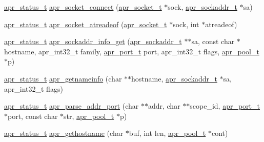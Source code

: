 \begin{DoxyCompactItemize}
\item 
\hyperlink{group__apr__errno_gaf76ee4543247e9fb3f3546203e590a6c}{apr\-\_\-status\-\_\-t} \hyperlink{group__apr__network__io_ga8e58bd8112ed2ce5004487918cd9275e}{apr\-\_\-socket\-\_\-connect} (\hyperlink{group__apr__network__io_ga49262b223e7434746e1f1737659aa2c3}{apr\-\_\-socket\-\_\-t} $\ast$sock, \hyperlink{structapr__sockaddr__t}{apr\-\_\-sockaddr\-\_\-t} $\ast$sa)
\item 
\hyperlink{group__apr__errno_gaf76ee4543247e9fb3f3546203e590a6c}{apr\-\_\-status\-\_\-t} \hyperlink{group__apr__network__io_gabfcb1fe4447921e5b86d395126b5d6f0}{apr\-\_\-socket\-\_\-atreadeof} (\hyperlink{group__apr__network__io_ga49262b223e7434746e1f1737659aa2c3}{apr\-\_\-socket\-\_\-t} $\ast$sock, int $\ast$atreadeof)
\item 
\hyperlink{group__apr__errno_gaf76ee4543247e9fb3f3546203e590a6c}{apr\-\_\-status\-\_\-t} \hyperlink{group__apr__network__io_gaa2f399ca2b60b35c0abf7630298c6c9f}{apr\-\_\-sockaddr\-\_\-info\-\_\-get} (\hyperlink{structapr__sockaddr__t}{apr\-\_\-sockaddr\-\_\-t} $\ast$$\ast$sa, const char $\ast$hostname, apr\-\_\-int32\-\_\-t family, \hyperlink{group__apr__network__io_gaa670a71960f6eb4fe0d0de2a1e7aba03}{apr\-\_\-port\-\_\-t} port, apr\-\_\-int32\-\_\-t flags, \hyperlink{group__apr__pools_gaf137f28edcf9a086cd6bc36c20d7cdfb}{apr\-\_\-pool\-\_\-t} $\ast$p)
\item 
\hyperlink{group__apr__errno_gaf76ee4543247e9fb3f3546203e590a6c}{apr\-\_\-status\-\_\-t} \hyperlink{group__apr__network__io_ga7a56fd9573b942753738ec30b887c9de}{apr\-\_\-getnameinfo} (char $\ast$$\ast$hostname, \hyperlink{structapr__sockaddr__t}{apr\-\_\-sockaddr\-\_\-t} $\ast$sa, apr\-\_\-int32\-\_\-t flags)
\item 
\hyperlink{group__apr__errno_gaf76ee4543247e9fb3f3546203e590a6c}{apr\-\_\-status\-\_\-t} \hyperlink{group__apr__network__io_ga90c31b2f012c6b1e2d842a96c4431de3}{apr\-\_\-parse\-\_\-addr\-\_\-port} (char $\ast$$\ast$addr, char $\ast$$\ast$scope\-\_\-id, \hyperlink{group__apr__network__io_gaa670a71960f6eb4fe0d0de2a1e7aba03}{apr\-\_\-port\-\_\-t} $\ast$port, const char $\ast$str, \hyperlink{group__apr__pools_gaf137f28edcf9a086cd6bc36c20d7cdfb}{apr\-\_\-pool\-\_\-t} $\ast$p)
\item 
\hyperlink{group__apr__errno_gaf76ee4543247e9fb3f3546203e590a6c}{apr\-\_\-status\-\_\-t} \hyperlink{group__apr__network__io_ga6bd3d656ba935ca428075f477b8a6f8b}{apr\-\_\-gethostname} (char $\ast$buf, int len, \hyperlink{group__apr__pools_gaf137f28edcf9a086cd6bc36c20d7cdfb}{apr\-\_\-pool\-\_\-t} $\ast$cont)

\end{DoxyCompactItemize}
